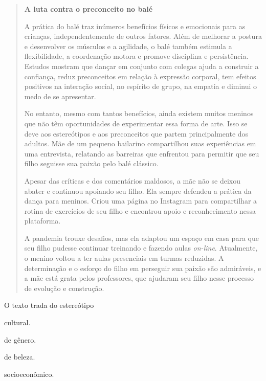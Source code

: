 \begin{quote}
\textbf{A luta contra o preconceito no balé}

A prática do balé traz inúmeros benefícios físicos e emocionais para as crianças, independentemente de 
outros fatores. Além de melhorar a postura e desenvolver os músculos e a agilidade, o balé também estimula 
a flexibilidade, a coordenação motora e promove disciplina e persistência. Estudos mostram que dançar em 
conjunto com colegas ajuda a construir a confiança, reduz preconceitos em relação à expressão corporal, tem 
efeitos positivos na interação social, no espírito de grupo, na empatia e diminui o medo de se apresentar.

No entanto, mesmo com tantos benefícios, ainda existem muitos meninos que não têm oportunidades de 
experimentar essa forma de arte. Isso se deve aos estereótipos e aos preconceitos que partem principalmente 
dos adultos. Mãe de um pequeno bailarino compartilhou suas experiências em uma entrevista, relatando as 
barreiras que enfrentou para permitir que seu filho seguisse sua paixão pelo balé clássico.

Apesar das críticas e dos comentários maldosos, a mãe não se deixou abater e continuou apoiando seu filho. 
Ela sempre defendeu a prática da dança para meninos. Criou uma página no Instagram para compartilhar a rotina de exercícios de seu filho e encontrou apoio e reconhecimento nessa plataforma.

A pandemia trouxe desafios, mas ela adaptou um espaço em casa para que seu filho pudesse continuar 
treinando e fazendo aulas \textit{on-line}. Atualmente, o menino voltou a ter aulas presenciais em turmas 
reduzidas. A determinação e o esforço do filho em perseguir sua paixão são admiráveis, e a mãe está grata pelos professores, que ajudaram seu filho nesse processo de evolução e construção.

\end{quote}

O texto trada do estereótipo

\begin{escolha}
\item
  cultural.
\item
  de gênero.
\item
  de beleza.
\item
  socioeconômico.
\end{escolha}

